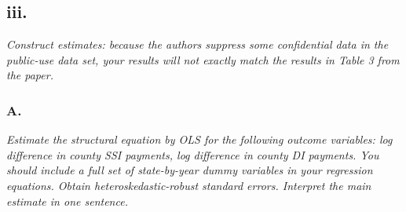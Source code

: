 \documentclass[
]{article}
\newenvironment{Shaded}{\begin{snugshade}}{\end{snugshade}}
\newcommand{\CommentTok}[1]{\textcolor[rgb]{0.56,0.35,0.01}{\textit{#1}}}
\newcommand{\DataTypeTok}[1]{\textcolor[rgb]{0.13,0.29,0.53}{#1}}
\newcommand{\DecValTok}[1]{\textcolor[rgb]{0.00,0.00,0.81}{#1}}
\newcommand{\KeywordTok}[1]{\textcolor[rgb]{0.13,0.29,0.53}{\textbf{#1}}}
\newcommand{\NormalTok}[1]{#1}
\newcommand{\OperatorTok}[1]{\textcolor[rgb]{0.81,0.36,0.00}{\textbf{#1}}}
\newcommand{\OtherTok}[1]{\textcolor[rgb]{0.56,0.35,0.01}{#1}}
\newcommand{\StringTok}[1]{\textcolor[rgb]{0.31,0.60,0.02}{#1}}
\begin{document}
\begin{Shaded}
\end{Shaded}

\hypertarget{iii.-2}{%
\subsection{iii.}\label{iii.-2}}

\textit{Construct estimates: because the authors suppress some confidential data in the public-use data set, your results will not exactly match the results in Table 3 from the paper.}

\hypertarget{a.-7}{%
\subsubsection{A.}\label{a.-7}}

\textit{Estimate the structural equation by OLS for the following outcome variables: log difference in county SSI payments, log difference in county DI payments. You should include a full set of state-by-year dummy variables in your regression equations. Obtain heteroskedastic-robust standard errors. Interpret the main estimate in one sentence.}
\end{document}

